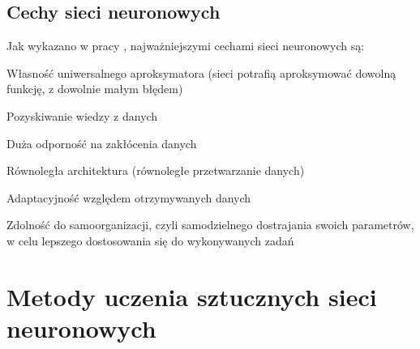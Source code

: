 \newpage
\subsection{Cechy sieci neuronowych}
Jak wykazano w pracy \cite{dudek:wyklad:sieciAproksymacja}, najważniejszymi cechami sieci neuronowych są:
\begin{enumerate*}
\item Własność uniwersalnego aproksymatora (sieci potrafią aproksymować dowolną funkcję, z dowolnie małym błędem)
\item Pozyskiwanie wiedzy z danych
\item Duża odporność na zakłócenia danych
\item Równoległa architektura (równoległe przetwarzanie danych)
\item Adaptacyjność względem otrzymywanych danych
\item Zdolność do samoorganizacji, czyli samodzielnego dostrajania swoich
parametrów, w celu lepszego dostosowania się do wykonywanych zadań
\end{enumerate*}

\newpage
\section{Metody uczenia sztucznych sieci neuronowych}

